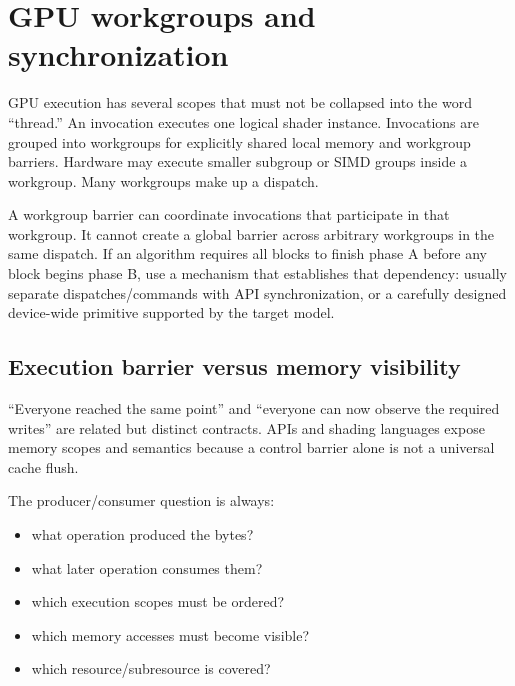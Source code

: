 \hypertarget{appendix-f662b5b1773b}{}\label{referencestart:appendix-f662b5b1773b}
\section{GPU workgroups and synchronization}\label{appendix-f662b5b1773b-gpu-workgroups-and-synchronization}

\hypertarget{appendix-f662b5b1773b-gpu-workgroups-and-synchronization}{}

GPU execution has several scopes that must not be collapsed into the word ``thread.'' An invocation executes one logical shader instance. Invocations are grouped into workgroups for explicitly shared local memory and workgroup barriers. Hardware may execute smaller subgroup or SIMD groups inside a workgroup. Many workgroups make up a dispatch.

A workgroup barrier can coordinate invocations that participate in that workgroup. It cannot create a global barrier across arbitrary workgroups in the same dispatch. If an algorithm requires all blocks to finish phase A before any block begins phase B, use a mechanism that establishes that dependency: usually separate dispatches/commands with API synchronization, or a carefully designed device-wide primitive supported by the target model.

\subsection{Execution barrier versus memory visibility}\label{appendix-f662b5b1773b-execution-barrier-versus-memory-visibility}

\hypertarget{appendix-f662b5b1773b-execution-barrier-versus-memory-visibility}{}

``Everyone reached the same point'' and ``everyone can now observe the required writes'' are related but distinct contracts. APIs and shading languages expose memory scopes and semantics because a control barrier alone is not a universal cache flush.

The producer/consumer question is always:

\begin{itemize}
\tightlist
\item
  what operation produced the bytes?
\item
  what later operation consumes them?
\item
  which execution scopes must be ordered?
\item
  which memory accesses must become visible?
\item
  which resource/subresource is covered?
\end{itemize}


